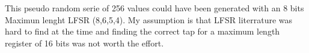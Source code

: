 This pseudo random serie of 256 values could have been generated with an 8 bits Maximun lenght LFSR (8,6,5,4). My assumption is that LFSR literrature was hard to find at the time and finding the correct tap for a maximum length register of 16 bits was not worth the effort.\\







